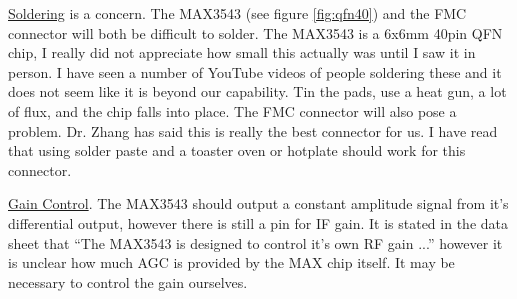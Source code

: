 \documentclass[a4paper, 12pt]{article}
\begin{document}
\underline{Soldering} is a concern.  The MAX3543 (see figure \ref{fig:qfn40}) and the FMC connector will both be difficult to solder.  The MAX3543 is a 6x6mm 40pin QFN chip, I really did not appreciate how small this actually was until I saw it in person.  I have seen a number of YouTube videos of people soldering these and it does not seem like it is beyond our capability.  Tin the pads, use a heat gun, a lot of flux, and the chip falls into place.  The FMC connector will also pose a problem.  Dr. Zhang has said this is really the best connector for us.  I have read that using solder paste and a toaster oven or hotplate should work for this connector.

\underline{Gain Control}.  The MAX3543 should output a constant amplitude signal from it's differential output, however there is still a pin for IF gain.  It is stated in the data sheet that ``The MAX3543 is designed to control it's own RF gain ...'' however it is unclear how much AGC is provided by the MAX chip itself.  It may be necessary to control the gain ourselves.

\clearpage


\end{document}
